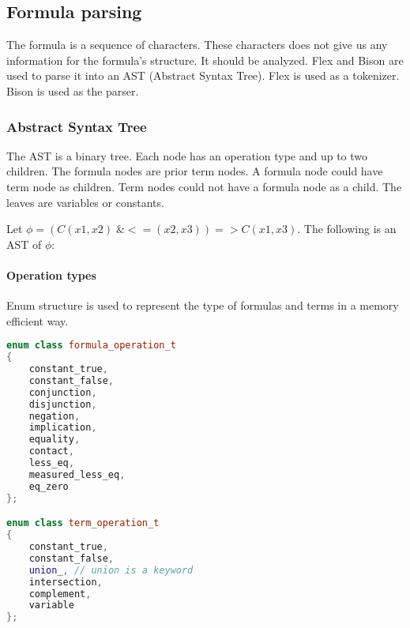 \documentclass{article}
\begin{document}
	\subsection{Formula parsing}
	The formula is a sequence of characters. These characters does not give us any information for the formula's structure. It should be analyzed. Flex \cite{flex-tokenizer} and Bison \cite{bison-parser} are used to parse it into an AST (Abstract Syntax Tree). Flex is used as a tokenizer. Bison is used as the parser.

	\subsubsection{Abstract Syntax Tree}
	The AST is a binary tree. Each node has an operation type and up to two children. The formula nodes are prior term nodes. A formula node could have term node as children. Term nodes could not have a formula node as a child. The leaves are variables or constants.
	
	Let $\phi = (C(x1,x2) \;\& <=(x2, x3)) => C(x1, x3)$. The following is an AST of $\phi$:


	\newpage
	\paragraph{Operation types} Enum structure is used to represent the type of formulas and terms in a memory efficient way.

	\begin{lstlisting}[language=C++]
enum class formula_operation_t
{
    constant_true,
    constant_false,
    conjunction,
    disjunction,
    negation,
    implication,
    equality,
    contact,
    less_eq,
    measured_less_eq,
    eq_zero
};

enum class term_operation_t
{
    constant_true,
    constant_false,
    union_, // union is a keyword
    intersection,
    complement,
    variable
};
	\end{lstlisting}
\end{document}
